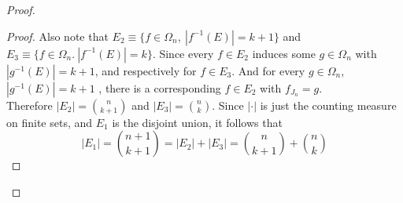\documentclass[../../main.tex]{subfiles}
\begin{document}
\begin{proof}
\begin{proof}
    Also note that $E_2\equiv \{f\in\Omega_{n},\: |f^{-1}(E)| = k+1\}$ and $E_3\equiv\{f\in\Omega_{n}.\: |f^{-1}(E)| = k\}$. Since every $f\in E_2$ induces some $g\in\Omega_n$ with $|g^{-1}(E)|=k+1$, and respectively for $f\in E_3$. And for every $g\in\Omega_n$, $|g^{-1}(E)|=k+1$ , there is a corresponding $f\in E_2$ with $f_{J_n} = g$.\\
    
    Therefore $|E_2| = \binom{n}{k+1}$ and $|E_3| = \binom{n}{k}$. Since $|\cdot|$ is just the counting measure on finite sets, and $E_1$ is the disjoint union, it follows that
    \[
    |E_1| = \binom{n+1}{k+1} = |E_2| + |E_3| = \binom{n}{k+1} + \binom{n}{k}
    \]
\end{proof}
\end{proof}
\end{document}
